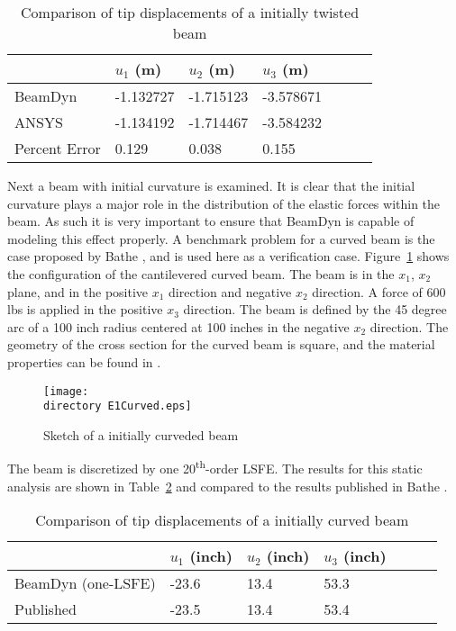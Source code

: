 \documentclass{aiaa-tc}
\def\directory{EPSF/}
\begin{document}
\begin{table}
\caption{\label{E1u} Comparison of tip displacements of a initially twisted beam} 
\begin{center} 
    \begin{tabular}{| l | l | l | l | l | l | l |}
    	\hline
    	        & $u_1$ (m) & $u_2$ (m) & $u_3$ (m)  \\ \hline
    	BeamDyn  & -1.132727     & -1.715123       & -3.578671      \\  \hline
    	ANSYS   & -1.134192     & -1.714467      & -3.584232     \\ \hline
    	Percent Error   & 0.129     & 0.038      & 0.155     \\ \hline
    \end{tabular}
\end{center}
\end{table} 

Next a beam with initial curvature is examined. It is clear that the initial curvature plays a major role in the distribution of the elastic forces within the beam. As such it is very important to ensure that BeamDyn is capable of modeling this effect properly. A benchmark problem for a curved beam is the case proposed by Bathe \cite{Bathe1979}, and is used here as a verification case. Figure~\ref{E1Curved} shows the configuration of the cantilevered curved beam. The beam is in the $x_1$, $x_2$ plane, and in the positive $x_1$ direction and negative $x_2$ direction. A force of 600 lbs is applied in the positive $x_3$ direction. The beam is defined by the 45 degree arc of a 100 inch radius centered at 100 inches in the negative $x_2$ direction.  The geometry of the cross section for the curved beam is square, and the material properties can be found in \cite{Bathe1979}. 
\begin{figure}
\centering
\texttt{[image: \\directory E1Curved.eps]}
\caption{Sketch of a initially curveded beam} 
\label{E1Curved}
\end{figure}
The beam is discretized by one 20\textsuperscript{th}-order LSFE. The results for this static analysis are shown in Table~\ref{E1CurvedDisp} and compared to the results published in Bathe \cite{Bathe1979}.

\begin{table}
\caption{\label{E1CurvedDisp} Comparison of tip displacements of a initially curved beam } 
\begin{center}
    \begin{tabular}{| l | l | l | l | l | l | l |}
    	\hline
    	        & $u_1$ (inch) & $u_2$ (inch) & $u_3$ (inch)  \\ \hline
    	BeamDyn (one-LSFE) & -23.6     & 13.4       & 53.3      \\  \hline
    	Published   & -23.5     & 13.4       & 53.4     \\ \hline
    \end{tabular}
\end{center}
\end{table} 
\end{document}
